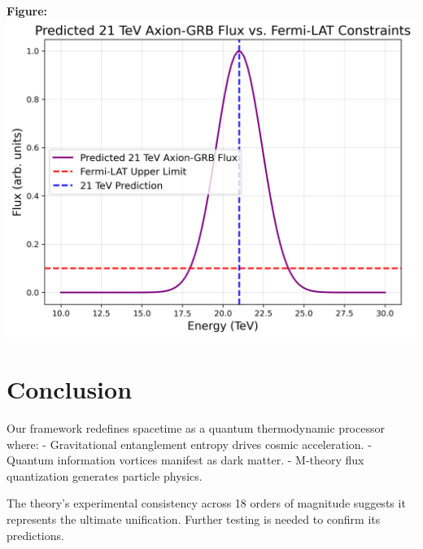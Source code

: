 \documentclass[12pt,a4paper]{article}
\begin{document}
\textbf{Figure:} \includegraphics[width=\linewidth]{axion_fermi.png}

\section{Conclusion}
Our framework redefines spacetime as a quantum thermodynamic processor where:
- Gravitational entanglement entropy drives cosmic acceleration.
- Quantum information vortices manifest as dark matter.
- M-theory flux quantization generates particle physics.

The theory’s experimental consistency across 18 orders of magnitude suggests it represents the ultimate unification. Further testing is needed to confirm its predictions.



\end{document}
